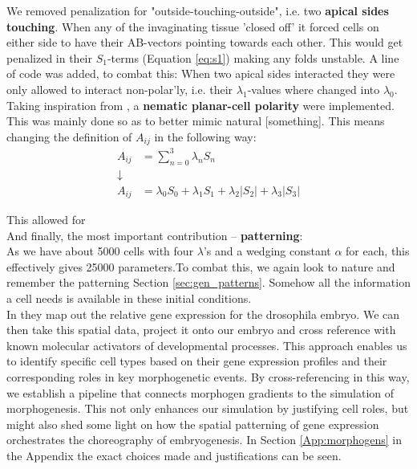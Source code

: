 We removed penalization for "outside-touching-outside", i.e. two \textbf{apical sides touching}. When any of the invaginating tissue 'closed off' it forced cells on either side to have their AB-vectors pointing towards each other. This would get penalized in their $S_1$-terms (Equation \ref{eq:s1}) making any folds unstable. A line of code was added, to combat this: When two apical sides interacted they were only allowed to interact non-polar'ly, i.e. their $\lambda_1$-values where changed into $\lambda_0$.\\


Taking inspiration from , a \textbf{nematic planar-cell polarity} were implemented. This was mainly done so as to better mimic natural [something]. This means changing the definition of $A_{ij}$ in the following way:
\begin{align*}
    A_{ij}&=\sum_{n=0}^{3}\lambda_n  S_n\\ \downarrow \\A_{ij}&=\lambda_0S_0+\lambda_1S_1+\lambda_2|S_2|+\lambda_3|S_3|
\end{align*}

This allowed for \\

And finally, the most important contribution -- \textbf{patterning}:\\
As we have about 5000 cells with four $\lambda$'s and a wedging constant $\alpha$ for each, this effectively gives 25000 parameters.To combat this, we again look to nature and remember the patterning Section \ref{sec:gen_patterns}. Somehow all the information a cell needs is available in these initial conditions.\\


In  they map out the relative gene expression for the drosophila embryo. We can then take this spatial data, project it onto our embryo and cross reference with known molecular activators of developmental processes.  This approach enables us to identify specific cell types based on their gene expression profiles and their corresponding roles in key morphogenetic events. By cross-referencing in this way, we establish a pipeline that connects morphogen gradients to the simulation of morphogenesis. This not only enhances our simulation by justifying cell roles, but might also shed some light on how the spatial patterning of gene expression orchestrates the choreography of embryogenesis. In Section \ref{App:morphogens} in the Appendix the exact choices made and justifications can be seen.\\

